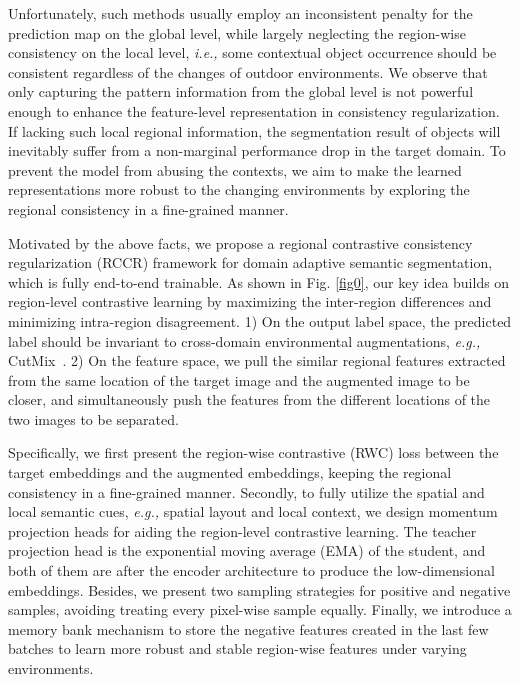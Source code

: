 \documentclass{article}
\begin{document}
Unfortunately, such methods usually employ an inconsistent penalty for the prediction map on the global level, while largely neglecting the region-wise consistency on the local level, \emph{i.e.,} some contextual object occurrence should be consistent regardless of the changes of outdoor environments. We observe that only capturing the pattern information from the global level is not powerful enough to enhance the feature-level representation in consistency regularization. If lacking such local regional information,  the segmentation result of objects will inevitably suffer from a non-marginal performance drop in the target domain. To prevent the model from abusing the contexts, we aim to make the learned representations more robust to the changing environments by exploring the regional consistency in a fine-grained manner.


Motivated by the above facts,  we propose a regional contrastive consistency regularization (RCCR) framework for domain adaptive semantic segmentation, which is fully end-to-end trainable. As shown in Fig. \ref{fig0}, our key idea builds on region-level contrastive learning by maximizing the inter-region differences and minimizing intra-region disagreement.
1) On the output label space, the predicted label should be invariant to cross-domain environmental augmentations, \emph{e.g.,} CutMix~\cite{french2019semi}. 2) On the feature space, we pull the similar regional features extracted from the same location of the target image and the augmented image to be closer, and simultaneously push the features from the different locations of the two images to be separated. 

Specifically, we first present the region-wise contrastive (RWC) loss between the target embeddings and the augmented embeddings, keeping the regional consistency in a fine-grained manner. Secondly, to fully utilize the spatial and local semantic cues, \emph{e.g.,} spatial layout and local context, we design momentum projection heads for aiding the region-level contrastive learning. The teacher projection head is the exponential moving average (EMA) of the student, and both of them are after the encoder architecture to produce the low-dimensional embeddings.
Besides, we present two sampling strategies for positive and negative samples,
avoiding treating every pixel-wise sample equally.
Finally, we introduce a memory bank mechanism to store the negative features created in the last few batches to learn more robust and stable region-wise features under varying environments. 
\end{document}
